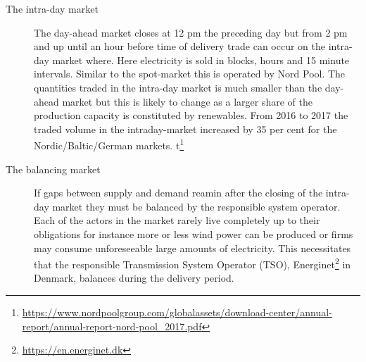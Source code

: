 \begin{description}
    \item [The intra-day market]
     The day-ahead market closes at 12 pm the preceding day but from 2 pm and up until an hour before time of delivery trade can occur on the intra-day market where. Here electricity is sold in blocks, hours and 15 minute intervals. Similar to the spot-market this is operated by Nord Pool. The quantities traded in the intra-day market is much smaller than the day-ahead market but this is likely to change as a larger share of the production capacity is constituted by renewables. From 2016 to 2017 the traded volume in the intraday-market increased by 35 per cent for the Nordic/Baltic/German markets.  t\footnote{\url{https://www.nordpoolgroup.com/globalassets/download-center/annual-report/annual-report-nord-pool_2017.pdf}}  %

    \item [The balancing market]
    If gaps between supply and demand reamin after the closing of the intra-day market they must be balanced by the responsible system operator. Each of the actors in the market rarely live completely up to their obligations for instance more or less wind power can be produced or firms may consume unforeseeable large amounts of electricity. This necessitates that the responsible Transmission System Operator (TSO), Energinet\footnote{\url{https://en.energinet.dk}} in Denmark, balances during the delivery period. %


\end{description}


